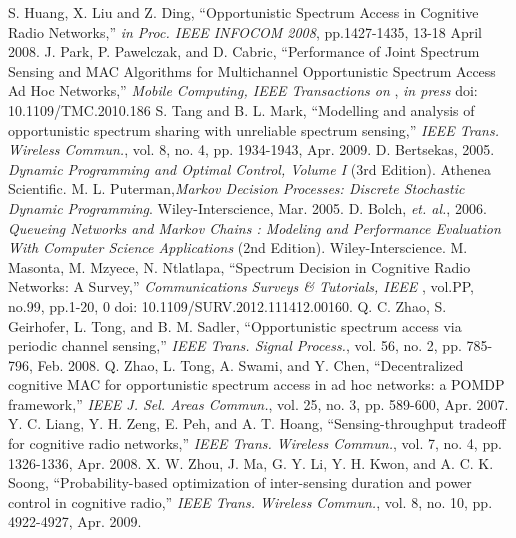 \begin{thebibliography}{}
 S. Huang, X. Liu and Z. Ding, ``Opportunistic Spectrum Access in Cognitive Radio Networks,'' \emph{in Proc. IEEE INFOCOM 2008}, pp.1427-1435, 13-18 April 2008.
 J. Park, P. Pawelczak, and D. Cabric, ``Performance of Joint Spectrum Sensing and MAC Algorithms for Multichannel Opportunistic Spectrum Access Ad Hoc Networks,'' \emph{Mobile Computing, IEEE Transactions on }, \textit{in press} doi: 10.1109/TMC.2010.186
 S. Tang and B. L. Mark, ``Modelling and analysis of opportunistic spectrum sharing with unreliable spectrum sensing,'' \emph{IEEE Trans. Wireless Commun.}, vol. 8, no. 4, pp. 1934-1943, Apr. 2009.
 D. Bertsekas, 2005. \emph{Dynamic Programming and Optimal Control, Volume I} (3rd Edition). Athenea Scientific.
 M. L. Puterman,\emph{Markov Decision Processes: Discrete Stochastic Dynamic Programming}. Wiley-Interscience, Mar. 2005.
 D. Bolch, \textit{et. al.}, 2006. \emph{Queueing Networks and Markov Chains : Modeling and Performance Evaluation With Computer Science Applications} (2nd Edition). Wiley-Interscience.
 M. Masonta, M. Mzyece, N. Ntlatlapa, ``Spectrum Decision in Cognitive Radio Networks: A Survey,'' \emph{Communications Surveys \& Tutorials, IEEE }, vol.PP, no.99, pp.1-20, 0 doi: 10.1109/SURV.2012.111412.00160.
 Q. C. Zhao, S. Geirhofer, L. Tong, and B. M. Sadler, ``Opportunistic spectrum access via periodic channel sensing,'' \emph{IEEE Trans. Signal Process.}, vol. 56, no. 2, pp. 785-796, Feb. 2008.
 Q. Zhao, L. Tong, A. Swami, and Y. Chen, ``Decentralized cognitive MAC for opportunistic spectrum access in ad hoc networks: a POMDP framework,'' \emph{IEEE J. Sel. Areas Commun.}, vol. 25, no. 3, pp. 589-600, Apr. 2007.
 Y. C. Liang, Y. H. Zeng, E. Peh, and A. T. Hoang, ``Sensing-throughput tradeoff for cognitive radio networks,'' \emph{IEEE Trans. Wireless Commun.}, vol. 7, no. 4, pp. 1326-1336, Apr. 2008.
 X. W. Zhou, J. Ma, G. Y. Li, Y. H. Kwon, and A. C. K. Soong, ``Probability-based optimization of inter-sensing duration and power control in cognitive radio,'' \emph{IEEE Trans. Wireless Commun.}, vol. 8, no.
10, pp. 4922-4927, Apr. 2009.

\end{thebibliography}
